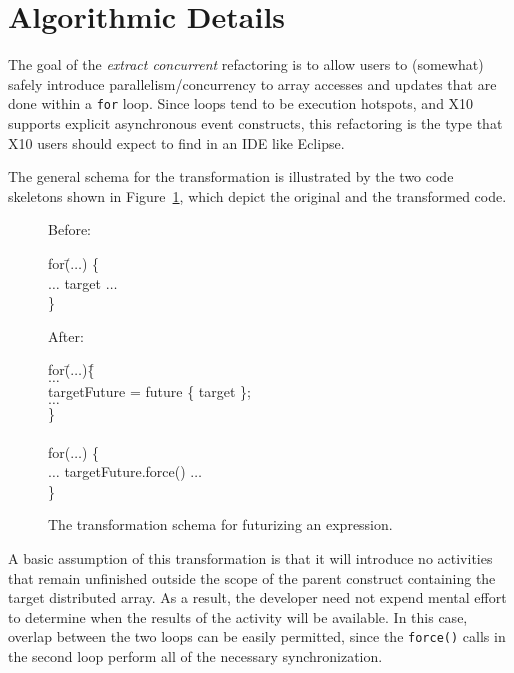 \section{Algorithmic Details}

The goal of the {\it extract concurrent} refactoring is to allow
users to (somewhat) safely introduce parallelism/concurrency to
array accesses and updates that are done within a {\tt for}
loop.
Since loops tend to be execution hotspots, and X10 supports explicit
asynchronous event constructs, this
refactoring is the type that X10 users should expect to find in an IDE
like Eclipse.

The general schema for the transformation is illustrated by the two
code skeletons shown in Figure~\ref{fig:transformSchema}, which
depict the original and the transformed code.

\begin{figure}[tp]
 Before:
\begin{code}
for(\=$\ldots$) \{\\
\> $\ldots$ target $\ldots$\\
\}
\end{code}

After:
\begin{code}
for(\=$\ldots$)\= \{\\
\> $\ldots$\\
\> targetFuture = future \{ target \};\\
\> $\ldots$\\
\}\\\\
for($\ldots$) \{\\
\> $\ldots$ targetFuture.force() $\ldots$\\
\}
\end{code}
\caption{\label{fig:transformSchema}The transformation schema for futurizing an expression.}
\end{figure}

A basic assumption of this transformation is that it will introduce
no activities that remain unfinished outside the scope of the parent
construct containing the target distributed array.
As a result, the developer need not expend mental effort to determine
when the results of the activity will be available.
In this case, overlap between the two loops can be
easily permitted, since the {\tt force()} calls in the second loop
perform all of the necessary synchronization.

